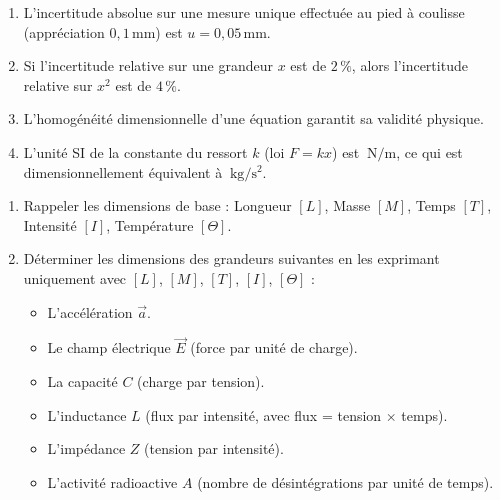 \documentclass[11pt]{article}
\begin{document}
\begin{exercice}
\begin{enumerate}
    \item L'incertitude absolue sur une mesure unique effectuée au pied à coulisse (appréciation $0,1\,\text{mm}$) est $u = 0,05\,\text{mm}$.
    \item Si l'incertitude relative sur une grandeur $x$ est de $2\,\%$, alors l'incertitude relative sur $x^2$ est de $4\,\%$.
    \item L'homogénéité dimensionnelle d'une équation garantit sa validité physique.
    \item L'unité SI de la constante du ressort $k$ (loi $F = kx$) est $\SI{}{\newton\per\metre}$, ce qui est dimensionnellement équivalent à $\SI{}{\kilogram\per\second\squared}$.
\end{enumerate}
\end{exercice}

\begin{exercice}
\begin{enumerate}
    \item Rappeler les dimensions de base : Longueur $[L]$, Masse $[M]$, Temps $[T]$, Intensité $[I]$, Température $[\Theta]$.
    \item Déterminer les dimensions des grandeurs suivantes en les exprimant uniquement avec $[L]$, $[M]$, $[T]$, $[I]$, $[\Theta]$ :
    \begin{itemize}
        \item L'accélération $\vec{a}$.
        \item Le champ électrique $\vec{E}$ (force par unité de charge).
        \item La capacité $C$ (charge par tension).
        \item L'inductance $L$ (flux par intensité, avec flux = tension $\times$ temps).
        \item L'impédance $Z$ (tension par intensité).
        \item L'activité radioactive $A$ (nombre de désintégrations par unité de temps).
    \end{itemize}
\end{enumerate}
\end{exercice}
\end{document}
